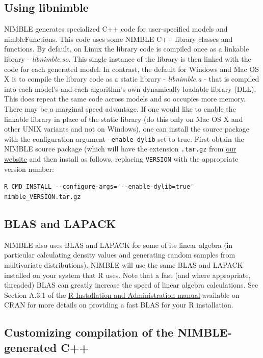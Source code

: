 \documentclass[12pt,oneside]{book}\usepackage[]{graphicx}\usepackage[]{color}
\def\cd#1{\texttt{#1}}
\def\nm#1{\textit{#1}}
\begin{document}
\subsection{Using libnimble}
NIMBLE generates specialized C++ code for user-specified models and nimbleFunctions.
This code uses some NIMBLE C++ library classes and functions.
By default, on Linux the library code is compiled once as a linkable
library - \nm{libnimble.so}. This single instance of the library is then linked 
with the code for each generated model. In contrast, the default for Windows and Mac OS X
is to compile the library code as a static library - \nm{libnimble.a} - that is compiled into each model's and each algorithm's own dynamically loadable library (DLL). This does repeat the same code across models and so occupies more memory. There may be a marginal speed advantage. 
If one would like to enable the linkable library in place of the static library (do this only on Mac OS X and other UNIX variants and not on Windows), one can install the source package with the configuration argument \cd{--enable-dylib} set to true. First obtain the NIMBLE source package (which will have the extension \cd{.tar.gz} from \href{http://r-nimble.org/download}{our website} and then install as follows, replacing \cd{VERSION} with the appropriate version number:

\verb|R CMD INSTALL --configure-args='--enable-dylib=true' nimble_VERSION.tar.gz|

\subsection{BLAS and LAPACK}
\label{sec:blas}

NIMBLE also uses BLAS and LAPACK for some of its linear algebra (in
particular calculating density values and generating random samples
from multivariate distributions). NIMBLE will use the same BLAS and
LAPACK installed on your system that R uses. Note that a fast (and
where appropriate, threaded) BLAS can greatly increase the speed of
linear algebra calculations. See Section A.3.1 of the \href{https://cran.r-project.org/doc/manuals/r-release/R-admin.html}{R Installation and Administration manual} available on CRAN for more details on providing a fast BLAS for your R installation. 

\subsection{Customizing compilation of the NIMBLE-generated C++}
\end{document}
